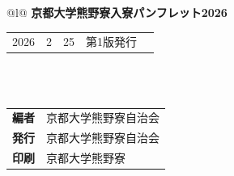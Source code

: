 
\vspace*{\fill} %


\begin{flushleft}
  \begin{tabular*}{\textwidth}{@{}l@{\extracolsep{\fill}}}
      \textbf{\huge 京都大学熊野寮入寮パンフレット2026} \\
      \hline
      \begin{tabular}{@{}r@{年\kern.5zw}r@{月\kern.5zw}r@{日\kern1.5zw}ll}
          2026 &  2 & 25 & 第1版発行 & \\
      \end{tabular} \\
      \\
      \begin{tabular}{@{}l@{\kern.5zw\textbf{:}\kern1zw}l}
          \textbf{編者} & 京都大学熊野寮自治会 \\
          \textbf{発行} & 京都大学熊野寮自治会 \\
          \textbf{印刷} & 京都大学熊野寮 \\
      \end{tabular} \\
      \hline
  \end{tabular*}
\end{flushleft}